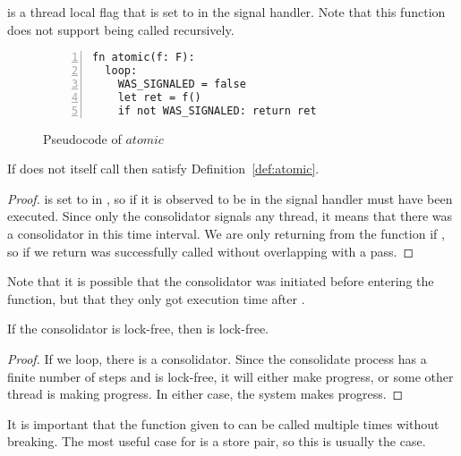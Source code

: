 
   is a thread local flag that is
  set to  in the signal handler. Note that this function does not support being called
  recursively.
\begin{figure}[ht]
  \begin{lstlisting}[numbers=left,numberstyle=\color{gray}\ttfamily{}A]
fn atomic(f: F):
  loop:
    WAS_SIGNALED = false
    let ret = f()
    if not WAS_SIGNALED: return ret
\end{lstlisting}
\caption{Pseudocode of $atomic$}
\end{figure}

\begin{theorem}
  If  does not itself call  then  satisfy
  Definition~\ref{def:atomic}.
\end{theorem}
\begin{proof}
   is set to  in , so if it is observed to be
   in  the signal handler must have been executed. Since only the consolidator
  signals any thread, it means that there was a consolidator in this time interval. We are only
  returning from the function if , so if we return  was
  successfully called without overlapping with a pass.
\end{proof}
Note that it is possible that the consolidator was initiated before entering the 
function, but that they only got execution time after .
\begin{lemma}
  If the consolidator is lock-free, then  is lock-free.
\end{lemma}
\begin{proof}
  If we loop, there is a consolidator. Since the consolidate process has a finite number of steps
  and is lock-free, it will either make progress, or some other thread is making progress. In
  either case, the system makes progress.
\end{proof}

It is important that the function given to  can be called multiple times without
breaking. The most useful case for  is a  store pair, so this is
usually the case.

